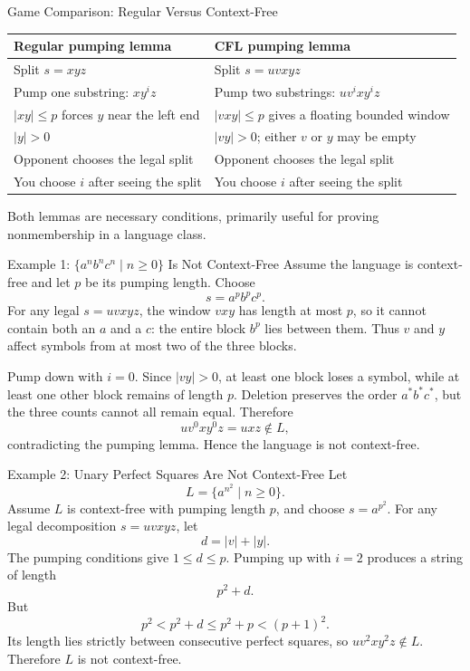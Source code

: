 \documentclass[10pt]{beamer}
\begin{document}
\begin{frame}{Game Comparison: Regular Versus Context-Free}
  \small
  \begin{center}
  \begin{tabular}{L{5.0cm}L{5.0cm}}
    \toprule
    Regular pumping lemma & CFL pumping lemma \\
    \midrule
    Split $s=xyz$ & Split $s=uvxyz$ \\
    Pump one substring: $xy^iz$ & Pump two substrings: $uv^ixy^iz$ \\
    $|xy|\le p$ forces $y$ near the left end & $|vxy|\le p$ gives a floating bounded window \\
    $|y|>0$ & $|vy|>0$; either $v$ or $y$ may be empty \\
    Opponent chooses the legal split & Opponent chooses the legal split \\
    You choose $i$ after seeing the split & You choose $i$ after seeing the split \\
    \bottomrule
  \end{tabular}
  \end{center}
  Both lemmas are necessary conditions, primarily useful for proving nonmembership in a language class.
\end{frame}

\begin{frame}{Example 1: $\{a^n b^n c^n\mid n\ge0\}$ Is Not Context-Free}
  \small
  Assume the language is context-free and let $p$ be its pumping length. Choose
  \[
    s=a^p b^p c^p.
  \]
  \pause
  For any legal $s=uvxyz$, the window $vxy$ has length at most $p$, so it cannot contain both an
  $a$ and a $c$: the entire block $b^p$ lies between them. Thus $v$ and $y$ affect symbols from at
  most two of the three blocks.

  Pump down with $i=0$. Since $|vy|>0$, at least one block loses a symbol, while at least one other
  block remains of length $p$. Deletion preserves the order $a^*b^*c^*$, but the three counts cannot
  all remain equal. Therefore
  \[
    uv^0xy^0z=uxz\notin L,
  \]
  contradicting the pumping lemma. Hence the language is not context-free.
\end{frame}

\begin{frame}{Example 2: Unary Perfect Squares Are Not Context-Free}
  Let
  \[
    L=\{a^{n^2}\mid n\ge0\}.
  \]
  Assume $L$ is context-free with pumping length $p$, and choose $s=a^{p^2}$.
  For any legal decomposition $s=uvxyz$, let
  \[
    d=|v|+|y|.
  \]
  The pumping conditions give $1\le d\le p$. Pumping up with $i=2$ produces a string of length
  \[
    p^2+d.
  \]
  But
  \[
    p^2<p^2+d\le p^2+p<(p+1)^2.
  \]
  Its length lies strictly between consecutive perfect squares, so $uv^2xy^2z\notin L$.
  Therefore $L$ is not context-free.
\end{frame}
\end{document}
